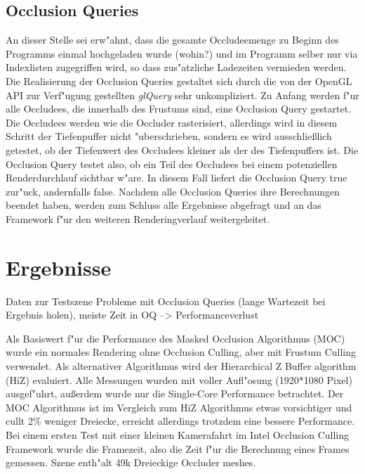 \documentclass[journal]{vgtc}
\begin{document}
\subsection{Occlusion Queries}
An dieser Stelle sei erw"ahnt, dass die gesamte Occludeemenge zu Beginn des Programms einmal hochgeladen wurde (wohin?) und im Programm selber nur via Indexlisten zugegriffen wird, so dass zus"atzliche Ladezeiten vermieden werden. Die Realisierung der Occlusion Queries gestaltet sich durch die von der OpenGL API zur Verf"ugung gestellten \textit{glQuery} sehr unkompliziert. Zu Anfang werden f"ur alle Occludees, die innerhalb des Frustums sind, eine Occlusion Query gestartet. Die Occludees werden wie die Occluder rasterisiert, allerdings wird in diesem Schritt der Tiefenpuffer nicht "uberschrieben, sondern es wird ausschlie{\ss}lich getestet, ob der Tiefenwert des Occludees kleiner als der des Tiefenpuffers ist. Die Occlusion Query testet also, ob ein Teil des Occludees bei einem potenziellen Renderdurchlauf sichtbar w"are. In diesem Fall liefert die Occlusion Query \glqq true\grqq{} zur"uck, andernfalls \glqq false\grqq{}. Nachdem alle Occlusion Queries ihre Berechnungen beendet haben, werden zum Schluss alle Ergebnisse abgefragt und an das Framework f"ur den weiteren Renderingverlauf weitergeleitet.



\section{Ergebnisse}
Daten zur Testszene
Probleme mit Occlusion Queries (lange Wartezeit bei Ergebnis holen), meiste Zeit in OQ --> Performanceverlust


Als Basiswert f"ur die Performance des Masked Occlusion Algorithmus (MOC) wurde ein normales Rendering ohne Occlusion Culling, aber mit Frustum Culling verwendet.
Als alternativer Algorithmus wird der \glqq Hierarchical Z Buffer algorithm \grqq{} (HiZ) evaluiert.
Alle Messungen wurden mit voller Aufl"osung (1920*1080 Pixel) ausgef"uhrt, au\ss{}erdem wurde nur die Single-Core Performance betrachtet.
Der MOC Algorithmus ist im Vergleich zum HiZ Algorithmus etwas vorsichtiger und cullt 2\% weniger Dreiecke, erreicht allerdings trotzdem eine bessere Performance.
Bei einem ersten Test mit einer kleinen Kamerafahrt im Intel Occlusion Culling Framework wurde die Framezeit, also die Zeit f"ur die Berechnung eines Frames gemessen.
Szene enth"alt 49k Dreieckige Occluder meshes.
\end{document}
